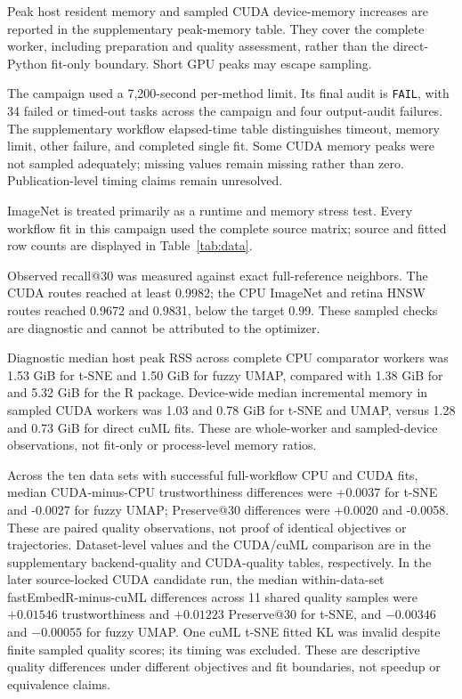 \documentclass[article]{jss}
\newcommand{\fastEmbedR}{\pkg{fastEmbedR}\xspace}
\begin{document}
Peak host resident memory and sampled CUDA device-memory increases are
reported in the supplementary peak-memory table. They cover the
complete worker, including preparation and quality assessment, rather than
the direct-Python fit-only boundary. Short GPU peaks may escape sampling.

The campaign used a 7,200-second per-method limit. Its final audit is
\texttt{FAIL}, with 34 failed or timed-out tasks across the campaign and
four output-audit failures. The supplementary workflow elapsed-time table
distinguishes timeout,
memory limit, other failure, and completed single fit. Some CUDA memory
peaks were not sampled adequately; missing values remain missing rather
than zero. Publication-level timing claims remain unresolved.

ImageNet is treated primarily as a runtime and memory stress test. Every
workflow fit in this campaign used the complete source matrix; source and
fitted row counts are displayed in Table~\ref{tab:data}.

Observed recall@30 was measured against exact full-reference neighbors.
The CUDA routes reached at least 0.9982; the CPU ImageNet and retina HNSW
routes reached 0.9672 and 0.9831, below the target 0.99. These sampled
checks are diagnostic and cannot be attributed to the optimizer.

Diagnostic median host peak RSS across complete CPU comparator workers was
1.53 GiB for \fastEmbedR t-SNE and 1.50 GiB for fuzzy UMAP, compared with
1.38 GiB for  and 5.32 GiB for the R  package.
Device-wide median incremental memory in sampled CUDA workers was
1.03 and 0.78 GiB for \fastEmbedR t-SNE and UMAP, versus 1.28 and
0.73 GiB for direct cuML fits. These are whole-worker and sampled-device
observations, not fit-only or process-level memory ratios.

Across the ten data sets with successful full-workflow CPU and CUDA fits,
median CUDA-minus-CPU trustworthiness differences were +0.0037 for t-SNE
and -0.0027 for fuzzy UMAP; Preserve@30 differences were +0.0020 and
-0.0058. These are paired quality observations, not proof of identical
objectives or trajectories. Dataset-level values and the CUDA/cuML
comparison are in the supplementary backend-quality and CUDA-quality
tables, respectively.
In the later source-locked CUDA candidate run, the median within-data-set
fastEmbedR-minus-cuML differences across 11 shared quality samples were
$+0.01546$ trustworthiness and $+0.01223$ Preserve@30 for t-SNE, and
$-0.00346$ and $-0.00055$ for fuzzy UMAP. One cuML t-SNE fitted KL was
invalid despite finite sampled quality scores; its timing was excluded.
These are descriptive quality differences under different objectives and
fit boundaries, not speedup or equivalence claims.
\end{document}
